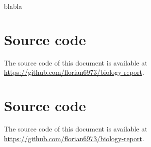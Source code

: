 \documentclass{article}
\begin{document}
    

    blabla

    \appendix

    \section {Source code}
        The source code of this document is available at \url{https://github.com/florian6973/biology-report}.

    \section {Source code}
        The source code of this document is available at \url{https://github.com/florian6973/biology-report}.
\end{document}
